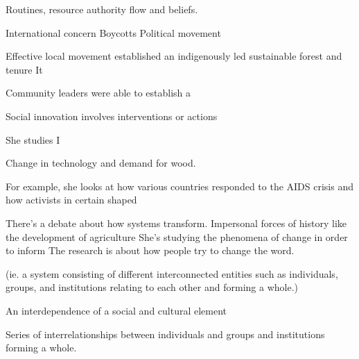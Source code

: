 Routines, resource authority flow and beliefs. 

International concern
Boycotts 
Political movement

Effective local movement established an indigenously led sustainable forest and tenure
It 



Community leaders were able to establish a 




Social innovation involves interventions or actions 




She studies I

Change in technology and demand for wood. 

For example, she looks at how various countries responded to the AIDS crisis and how activists in certain shaped 

There’s a debate about how systems transform. 
Impersonal forces of history like the development of agriculture
She’s studying the phenomena of change in order to inform 
The research is about how people try to change the word. 

(ie. a system consisting of different interconnected entities such as  individuals, groups, and institutions relating to each other and forming a whole.)

An interdependence of a social and cultural element 

Series of interrelationships between individuals and groups and institutions forming a whole. 



